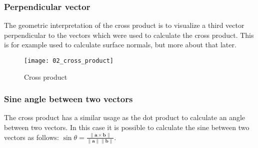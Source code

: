 \subsubsection{Perpendicular vector}

The geometric interpretation of the cross product is to visualize a third vector perpendicular to the vectors which were used to calculate the cross product. This is for example used to calculate surface normals, but more about that later.

\begin{figure}[H]
\centering
    \texttt{[image: 02\_cross\_product]}
\caption{Cross product}
\label{fig:cross-product}
\end{figure}

\subsubsection{Sine angle between two vectors}

The cross product has a similar usage as the dot product to calculate an angle between two vectors. In this case it is possible to calculate the sine between two vectors as follows: $\sin\theta=\frac{\|\textbf{a}\times\textbf{b}\|}{\|\textbf{a}\|\|\textbf{b}\|}$.
